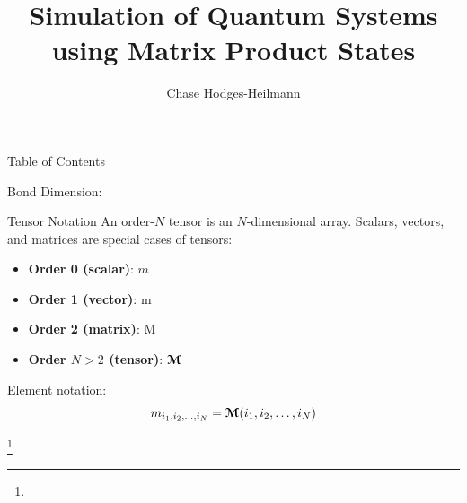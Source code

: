 \documentclass{beamer}
\title{Simulation of Quantum Systems using Matrix Product States}
\author{Chase Hodges-Heilmann}
\date{}
\newcommand{\euler}[1]{\boldsymbol{\EuScript{#1}}}
\newcommand{\romanL}[1]{\boldsymbol{\mathrm{#1}}}
\newcommand\blfootnote[1]{%
  \begingroup
  \renewcommand\thefootnote{}\footnote{#1}%
  \addtocounter{footnote}{-1}%
  \endgroup
}
\begin{document}
\maketitle

\begin{frame}{Table of Contents}
    \tableofcontents
\end{frame}




Bond Dimension:
\begin{frame}{Tensor Notation}
    An order-$N$ tensor is an $N$-dimensional array. Scalars, vectors, and matrices are special cases of tensors:
    \begin{itemize}
        \item \textbf{Order 0 (scalar)}: $m$
        \item \textbf{Order 1 (vector)}: $\romanL{m}$
        \item \textbf{Order 2 (matrix)}: $\romanL{M}$
        \item \textbf{Order $N > 2$ (tensor)}: $\euler{M}$
    \end{itemize}
    \pause
    Element notation:
    \[
        m_{i_1, i_2, \ldots, i_N} = \euler{M}(i_1, i_2, \ldots, i_N)
    \]

    \blfootnote{}
\end{frame}
\end{document}
